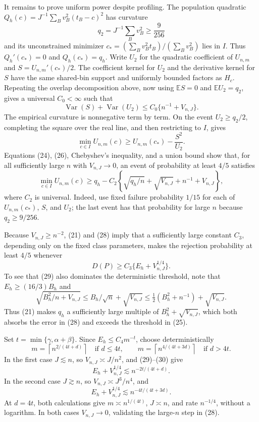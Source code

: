It remains to prove uniform power despite profiling. The population quadratic \(Q_h(c)=J^{-1}\sum_Bv_B^2(t_B-c)^2\) has curvature
\[
 q_2=J^{-1}\sum_Bv_B^2\ge\frac9{256}
\]
and its unconstrained minimizer \(c_*=(\sum_Bv_B^2t_B)/(\sum_Bv_B^2)\) lies in \(I\). Thus \(Q_h'(c_*)=0\) and \(Q_h(c_*)=q_h\). Write \(U_2\) for the quadratic coefficient of \(U_{n,m}\) and \(S=U_{n,m}'(c_*)/2\). The coefficient kernel for \(U_2\) and the derivative kernel for \(S\) have the same shared-bin support and uniformly bounded factors as \(H_c\). Repeating the overlap decomposition above, now using \(\mathbb ES=0\) and \(\mathbb EU_2=q_2\), gives a universal \(C_0<\infty\) such that
\[
 \operatorname{Var}(S)+\operatorname{Var}(U_2)
 \le C_0\{n^{-1}+V_{n,J}\}.                                        \tag{26}
\]
The empirical curvature is nonnegative term by term. On the event \(U_2\ge q_2/2\), completing the square over the real line, and then restricting to \(I\), gives
\[
 \min_{c\in I}U_{n,m}(c)
 \ge U_{n,m}(c_*)-\frac{S^2}{U_2}.                                  \tag{27}
\]
Equations (24), (26), Chebyshev's inequality, and a union bound show that, for all sufficiently large \(n\) with \(V_{n,J}\to0\), an event of probability at least \(4/5\) satisfies
\[
 \min_{c\in I}U_{n,m}(c)
 \ge q_h-C_2\left\{\sqrt{q_h/n}+\sqrt{V_{n,J}}+n^{-1}+V_{n,J}\right\}, \tag{28}
\]
where \(C_2\) is universal. Indeed, use fixed failure probability \(1/15\) for each of \(U_{n,m}(c_*)\), \(S\), and \(U_2\); the last event has that probability for large \(n\) because \(q_2\ge9/256\).

Because \(V_{n,J}\ge n^{-2}\), (21) and (28) imply that a sufficiently large constant \(C_3\), depending only on the fixed class parameters, makes the rejection probability at least \(4/5\) whenever
\[
 D(P)\ge C_3\{E_h+V_{n,J}^{1/4}\}.                                  \tag{29}
\]
To see that (29) also dominates the deterministic threshold, note that \(E_h\ge(16/3)B_h\) and
\[
 \sqrt{B_h^2/n+V_{n,J}}
 \le B_h/\sqrt n+\sqrt{V_{n,J}}
 \le\tfrac12(B_h^2+n^{-1})+\sqrt{V_{n,J}}.
\]
Thus (21) makes \(q_h\) a sufficiently large multiple of \(B_h^2+\sqrt{V_{n,J}}\), which both absorbs the error in (28) and exceeds the threshold in (25).

Set \(t=\min\{\gamma,\alpha+\beta\}\). Since \(E_h\le C_4m^{-t}\), choose deterministically
\[
 m=\left\lceil n^{2/(4t+d)}\right\rceil
 \quad\text{if }d\le4t,
 \qquad
 m=\left\lceil n^{4/(4t+3d)}\right\rceil
 \quad\text{if }d>4t.                                               \tag{30}
\]
In the first case \(J\lesssim n\), so \(V_{n,J}\asymp J/n^2\), and (29)--(30) give
\[
 E_h+V_{n,J}^{1/4}\lesssim n^{-2t/(4t+d)}.
\]
In the second case \(J\gtrsim n\), so \(V_{n,J}\asymp J^3/n^4\), and
\[
 E_h+V_{n,J}^{1/4}\lesssim n^{-4t/(4t+3d)}.
\]
At \(d=4t\), both calculations give \(m\asymp n^{1/(4t)}\), \(J\asymp n\), and rate \(n^{-1/4}\), without a logarithm. In both cases \(V_{n,J}\to0\), validating the large-\(n\) step in (28).

